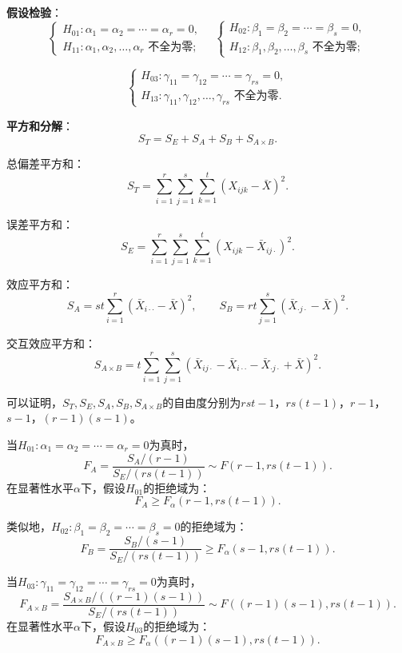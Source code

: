 \documentclass[11pt,a4paper]{report}
\theoremstyle{definition}
\begin{document}
\textbf{假设检验}：
\[
\begin{cases}
H_{01}\colon\alpha_{1}=\alpha_{2}=\cdots=\alpha_{r}=0,\\[0.3em]
H_{11}\colon\alpha_{1},\alpha_{2},\ldots,\alpha_{r}\text{ 不全为零};
\end{cases}
\quad
\begin{cases}
H_{02}\colon\beta_{1}=\beta_{2}=\cdots=\beta_{s}=0,\\[0.3em]
H_{12}\colon\beta_{1},\beta_{2},\ldots,\beta_{s}\text{ 不全为零};
\end{cases}
\]

\[
\begin{cases}
H_{03}\colon\gamma_{11}=\gamma_{12}=\cdots=\gamma_{rs}=0,\\[0.3em]
H_{13}\colon\gamma_{11},\gamma_{12},\ldots,\gamma_{rs}\text{ 不全为零}.
\end{cases}
\]

\textbf{平方和分解}：
\[
S_{T}=S_{E}+S_{A}+S_{B}+S_{A\times B}.
\]

总偏差平方和：
\[
S_{T}=\sum_{i=1}^{r}\sum_{j=1}^{s}\sum_{k=1}^{t}(X_{ijk}-\bar{X})^{2}.
\]

误差平方和：
\[
S_{E}=\sum_{i=1}^{r}\sum_{j=1}^{s}\sum_{k=1}^{t}(X_{ijk}-\bar{X}_{ij\cdot})^{2}.
\]

效应平方和：
\[
S_{A}=st\sum_{i=1}^{r}(\bar{X}_{i\cdot\cdot}-\bar{X})^{2},\qquad
S_{B}=rt\sum_{j=1}^{s}(\bar{X}_{\cdot j\cdot}-\bar{X})^{2}.
\]

交互效应平方和：
\[
S_{A\times B}=t\sum_{i=1}^{r}\sum_{j=1}^{s}(\bar{X}_{ij\cdot}-\bar{X}_{i\cdot\cdot}-\bar{X}_{\cdot j\cdot}+\bar{X})^{2}.
\]

可以证明，$S_{T},S_{E},S_{A},S_{B},S_{A\times B}$的自由度分别为$rst-1$，$rs(t-1)$，$r-1$，$s-1$，$(r-1)(s-1)$。

当$H_{01}\colon\alpha_{1}=\alpha_{2}=\cdots=\alpha_{r}=0$为真时，
\[
F_{A}=\frac{S_{A}/(r-1)}{S_{E}/(rs(t-1))}\sim F(r-1,rs(t-1)).
\]
在显著性水平$\alpha$下，假设$H_{01}$的拒绝域为：
\[
F_{A}\geq F_{\alpha}(r-1,rs(t-1)).
\]

类似地，$H_{02}\colon\beta_{1}=\beta_{2}=\cdots=\beta_{s}=0$的拒绝域为：
\[
F_{B}=\frac{S_{B}/(s-1)}{S_{E}/(rs(t-1))}\geq F_{\alpha}(s-1,rs(t-1)).
\]

当$H_{03}\colon\gamma_{11}=\gamma_{12}=\cdots=\gamma_{rs}=0$为真时，
\[
F_{A\times B}=\frac{S_{A\times B}/((r-1)(s-1))}{S_{E}/(rs(t-1))}\sim F((r-1)(s-1),rs(t-1)).
\]
在显著性水平$\alpha$下，假设$H_{03}$的拒绝域为：
\[
F_{A\times B}\geq F_{\alpha}((r-1)(s-1),rs(t-1)).
\]
\end{document}
